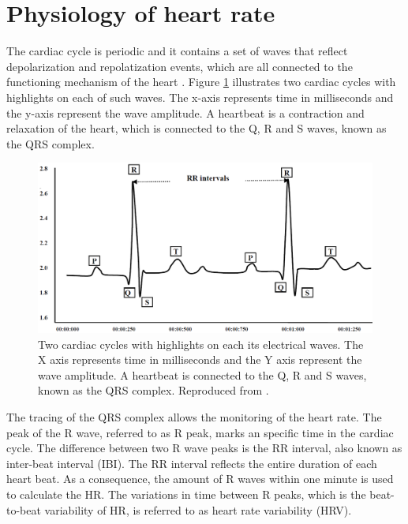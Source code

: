 \section{Physiology of heart rate}

The cardiac cycle is periodic and it contains a set of waves that reflect depolarization and repolatization events, which are all connected to the functioning mechanism of the heart \parencite{yanowitz2012introduction}. Figure \ref{fig:rr-interval} illustrates two cardiac cycles with highlights on each of such waves. The x-axis represents time in milliseconds and the y-axis represent the wave amplitude. A heartbeat is a contraction and relaxation of the heart, which is connected to the Q, R and S waves, known as the QRS complex.

\begin{figure}[h!]
    \centering
    \includegraphics[width=1.0\linewidth]{Content/figures/rr-interval.png}
    \caption{Two cardiac cycles with highlights on each its electrical waves. The X axis represents time in milliseconds and the Y axis represent the wave amplitude. A heartbeat is connected to the Q, R and S waves, known as the QRS complex. Reproduced from \textcite{ahmed2010heart}.}
    \label{fig:rr-interval}
\end{figure}

The tracing of the QRS complex allows the monitoring of the heart rate. The peak of the R wave, referred to as R peak, marks an specific time in the cardiac cycle. The difference between two R wave peaks is the RR interval, also known as inter-beat interval (IBI). The RR interval reflects the entire duration of each heart beat. As a consequence, the amount of R waves within one minute is used to calculate the HR. The variations in time between R peaks, which is the beat-to-beat variability of HR, is referred to as heart rate variability (HRV).

